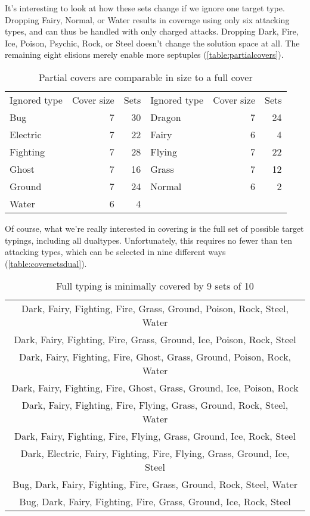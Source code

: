 It's interesting to look at how these sets change if we ignore one target type.
Dropping Fairy, Normal, or Water results in coverage using only six attacking types,
  and can thus be handled with only charged attacks.
Dropping Dark, Fire, Ice, Poison, Psychic, Rock, or Steel doesn't change the solution space at all.
The remaining eight elisions merely enable more septuples (\autoref{table:partialcovers}).
\begin{table}[ht]
\begin{centering}
  \begin{tabular}{lrr|lrr}
    Ignored type & Cover size & Sets & Ignored type & Cover size & Sets\\
    \Midrule
    Bug & 7 & 30 & Dragon & 7 & 24\\
    Electric & 7 & 22 & Fairy & 6 & 4\\
    Fighting & 7 & 28 & Flying & 7 & 22\\
    Ghost & 7 & 16 & Grass & 7 & 12\\
    Ground & 7 & 24 & Normal & 6 & 2\\
    Water & 6 & 4 & & & \\
  \end{tabular}
  \caption{Partial covers are comparable in size to a full cover}
  \label{table:partialcovers}
\end{centering}
\end{table}

Of course, what we're really interested in covering is the full set
  of possible target typings, including all dualtypes.
Unfortunately, this requires no fewer than ten attacking types,
  which can be selected in nine different ways (\autoref{table:coversetsdual}).
\begin{table}[ht]
\begin{centering}
  \begin{tabular}{c}
 Dark, Fairy, Fighting, Fire, Grass, Ground, Poison, Rock, Steel, Water\\
 Dark, Fairy, Fighting, Fire, Grass, Ground, Ice, Poison, Rock, Steel\\
 Dark, Fairy, Fighting, Fire, Ghost, Grass, Ground, Poison, Rock, Water\\
 Dark, Fairy, Fighting, Fire, Ghost, Grass, Ground, Ice, Poison, Rock\\
 Dark, Fairy, Fighting, Fire, Flying, Grass, Ground, Rock, Steel, Water\\
 Dark, Fairy, Fighting, Fire, Flying, Grass, Ground, Ice, Rock, Steel\\
 Dark, Electric, Fairy, Fighting, Fire, Flying, Grass, Ground, Ice, Steel\\
 Bug, Dark, Fairy, Fighting, Fire, Grass, Ground, Rock, Steel, Water\\
 Bug, Dark, Fairy, Fighting, Fire, Grass, Ground, Ice, Rock, Steel\\
  \end{tabular}
  \caption{Full typing is minimally covered by 9 sets of 10}
  \label{table:coversetsdual}
\end{centering}
\end{table}

